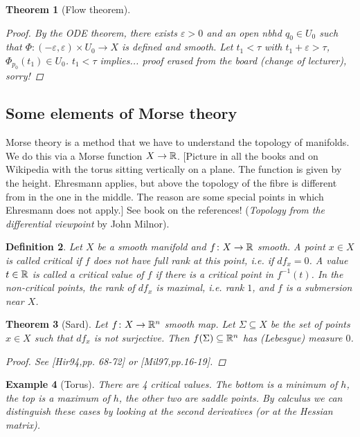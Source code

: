 \documentclass[A4paper, british, reqno]{amsart}
\theoremstyle{darkgreentheorem}
\newtheorem{thm}{Theorem}[section]
\theoremstyle{darkbluedefinition}
\newtheorem{defn}[thm]{Definition}
\theoremstyle{darkredexample}
\newtheorem{exa}[thm]{Example}
\theoremstyle{remark}
\newcommand{\1}{\mathbbm{1}}
\newcommand{\tms}{\times}
\newcommand{\sub}{\subseteq}
\begin{document}
\begin{thm}[Flow theorem]
\begin{proof}
	By the ODE theorem, there exists $\varepsilon >0$ and an open nbhd $q_{0}\in U_{0}$ such that $\Phi\colon (-\varepsilon, \varepsilon)\tms U_{0}\to X$ is defined and smooth.
	Let $t_{1}<\tau$ with $t_{1}+\varepsilon >\tau$, $\Phi_{p_{0}}(t_{1})\in U_{0}$.
	$t_{1}<\tau$ implies... proof erased from the board (change of lecturer), sorry!
    \end{proof}
\end{thm}

\subsection{Some elements of Morse theory}

Morse theory is a method that we have to understand the topology of manifolds.
We do this via a Morse function $X\to \mathbb{R}$.
[Picture in all the books and on Wikipedia with the torus sitting vertically on a plane.
The function is given by the height.
Ehresmann applies, but above the topology of the fibre is different from in the one in the middle.
The reason are some special points in which Ehresmann does not apply.]
See book on the references! (\textit{Topology from the differential viewpoint} by John Milnor).

\begin{defn}
    Let $X$ be a smooth manifold and $f\colon X\to \mathbb{R}$ smooth.
    A point $x\in X$ is called \textit{critical} if $f$ does not have full rank at this point, i.e. if $df_{x}=0$.
    A value $t\in \mathbb{R}$ is called a \textit{critical value} of $f$ if there is a critical point in $f^{-1}(t)$.
    In the non-critical points, the rank of $df_{x}$ is maximal, i.e. rank $1$, and $f$ is a submersion near $X$.
\end{defn}

\begin{thm}[Sard]
    Let $f\colon X\to \mathbb{R}^{n}$ smooth map.
    Let $\Sigma\sub X$ be the set of points $x\in X$ such that $df_{x}$ is not surjective.
    Then $f(\Sigma)\sub \R^{n}$ has (Lebesgue) measure $0$.
    \begin{proof}
	See [Hir94,pp. 68-72] or [Mil97,pp.16-19].
    \end{proof}
\end{thm}

\begin{exa}[Torus]
    There are 4 critical values.
    The bottom is a minimum of $h$, the top is a maximum of $h$, the other two are saddle points.
    By calculus we can distinguish these cases by looking at the second derivatives (or at the Hessian matrix).
\end{exa}
\end{document}
